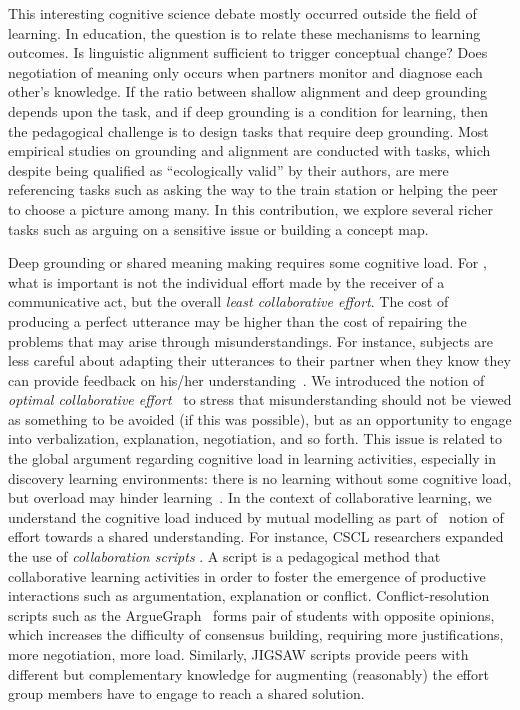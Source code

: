 \documentclass[twocolumn]{article}
\begin{document}
This interesting cognitive science debate mostly occurred outside the field of
learning. In education, the question is to relate these mechanisms to learning
outcomes. Is linguistic alignment sufficient to trigger conceptual change? Does
negotiation of meaning only occurs when partners monitor and diagnose each
other's knowledge. If the ratio between shallow alignment and deep grounding
depends upon the task, and if deep grounding is a condition for learning, then
the pedagogical challenge is to design tasks that require deep grounding. Most
empirical studies on grounding and alignment are conducted with tasks, which
despite being qualified as ``ecologically valid'' by their authors, are mere
referencing tasks such as asking the way to the train station or helping the
peer to choose a picture among many. In this contribution, we explore several
richer tasks such as arguing on a sensitive issue or building a concept map.  

Deep grounding or shared meaning making requires some cognitive load. For
\citet{clark1986referring}, what is important is not the individual effort made
by the receiver of a communicative act, but the overall \emph{least collaborative
effort}.  The cost of producing a perfect utterance may be higher than the cost
of repairing the problems that may arise through misunderstandings. For
instance, subjects are less careful about adapting their utterances to their
partner when they know they can provide feedback on his/her
understanding~\citep{schober1993spatial}. We introduced the notion of
\emph{optimal collaborative effort}~\citep{dillenbourg1995evolution} to stress
that misunderstanding should not be viewed as something to be avoided (if this
was possible), but as an opportunity to engage into verbalization, explanation,
negotiation, and so forth. This issue is related to the global argument
regarding cognitive load in learning activities, especially in discovery
learning environments: there is no learning without some cognitive load, but
overload may hinder learning~\citep{paas2003cognitive}. In the context of
collaborative learning, we understand the cognitive load induced by mutual
modelling as part of~\citet{schwartz1995emergence} notion of effort towards a
shared understanding. For instance, CSCL researchers expanded the use of
\emph{collaboration scripts} . A script is a pedagogical
method that collaborative learning activities in order to foster the emergence
of productive interactions such as argumentation, explanation or conflict.
Conflict-resolution scripts such as the {\sc
ArgueGraph}~\citep{dillenbourg2008mechanics} forms pair of students with
opposite opinions, which increases the difficulty of consensus building,
requiring more justifications, more negotiation, more load. Similarly, JIGSAW
scripts provide peers with different but complementary knowledge for augmenting
(reasonably) the effort group members have to engage to reach a shared solution. 
\end{document}
